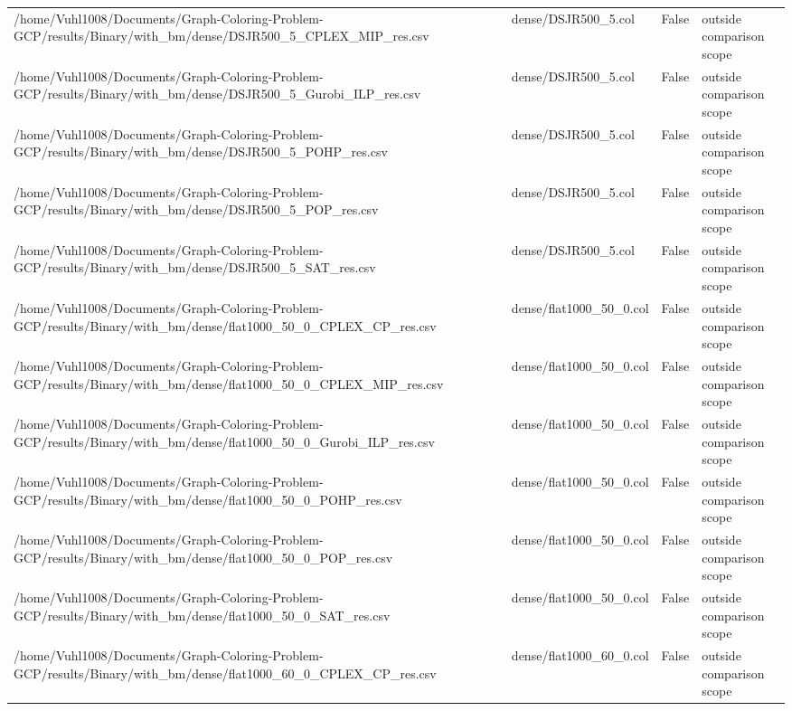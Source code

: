 \begin{table}[htbp]
\begin{tabular}{llll}
/home/Vuhl1008/Documents/Graph-Coloring-Problem-GCP/results/Binary/with\_bm/dense/DSJR500\_5\_CPLEX\_MIP\_res.csv & dense/DSJR500\_5.col & False & outside comparison scope \\
/home/Vuhl1008/Documents/Graph-Coloring-Problem-GCP/results/Binary/with\_bm/dense/DSJR500\_5\_Gurobi\_ILP\_res.csv & dense/DSJR500\_5.col & False & outside comparison scope \\
/home/Vuhl1008/Documents/Graph-Coloring-Problem-GCP/results/Binary/with\_bm/dense/DSJR500\_5\_POHP\_res.csv & dense/DSJR500\_5.col & False & outside comparison scope \\
/home/Vuhl1008/Documents/Graph-Coloring-Problem-GCP/results/Binary/with\_bm/dense/DSJR500\_5\_POP\_res.csv & dense/DSJR500\_5.col & False & outside comparison scope \\
/home/Vuhl1008/Documents/Graph-Coloring-Problem-GCP/results/Binary/with\_bm/dense/DSJR500\_5\_SAT\_res.csv & dense/DSJR500\_5.col & False & outside comparison scope \\
/home/Vuhl1008/Documents/Graph-Coloring-Problem-GCP/results/Binary/with\_bm/dense/flat1000\_50\_0\_CPLEX\_CP\_res.csv & dense/flat1000\_50\_0.col & False & outside comparison scope \\
/home/Vuhl1008/Documents/Graph-Coloring-Problem-GCP/results/Binary/with\_bm/dense/flat1000\_50\_0\_CPLEX\_MIP\_res.csv & dense/flat1000\_50\_0.col & False & outside comparison scope \\
/home/Vuhl1008/Documents/Graph-Coloring-Problem-GCP/results/Binary/with\_bm/dense/flat1000\_50\_0\_Gurobi\_ILP\_res.csv & dense/flat1000\_50\_0.col & False & outside comparison scope \\
/home/Vuhl1008/Documents/Graph-Coloring-Problem-GCP/results/Binary/with\_bm/dense/flat1000\_50\_0\_POHP\_res.csv & dense/flat1000\_50\_0.col & False & outside comparison scope \\
/home/Vuhl1008/Documents/Graph-Coloring-Problem-GCP/results/Binary/with\_bm/dense/flat1000\_50\_0\_POP\_res.csv & dense/flat1000\_50\_0.col & False & outside comparison scope \\
/home/Vuhl1008/Documents/Graph-Coloring-Problem-GCP/results/Binary/with\_bm/dense/flat1000\_50\_0\_SAT\_res.csv & dense/flat1000\_50\_0.col & False & outside comparison scope \\
/home/Vuhl1008/Documents/Graph-Coloring-Problem-GCP/results/Binary/with\_bm/dense/flat1000\_60\_0\_CPLEX\_CP\_res.csv & dense/flat1000\_60\_0.col & False & outside comparison scope \\

\end{tabular}
\end{table}
